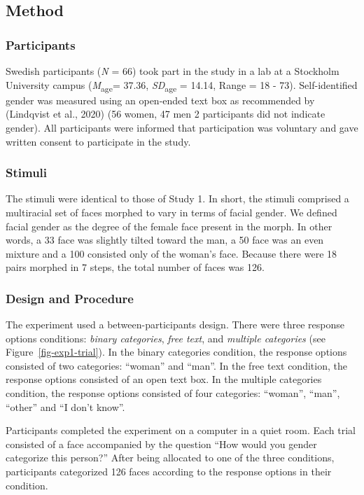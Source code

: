 \documentclass[
  man,
  longtable,
  nolmodern,
  notxfonts,
  notimes,
  colorlinks=true,linkcolor=blue,citecolor=blue,urlcolor=blue]{apa7}
\begin{document}
\subsection{Method}\label{method-1}

\subsubsection{Participants}\label{participants-1}

Swedish participants (\emph{N} = 66) took part in the study in a lab at
a Stockholm University campus (\emph{M}\textsubscript{age}= 37.36,
\emph{SD}\textsubscript{age} = 14.14, Range = 18 - 73). Self-identified
gender was measured using an open-ended text box as recommended by
(Lindqvist et al., 2020) (56 women, 47 men 2 participants did not
indicate gender). All participants were informed that participation was
voluntary and gave written consent to participate in the study.

\subsubsection{Stimuli}\label{stimuli-1}

The stimuli were identical to those of Study 1. In short, the stimuli
comprised a multiracial set of faces morphed to vary in terms of facial
gender. We defined facial gender as the degree of the female face
present in the morph. In other words, a 33 face was slightly tilted
toward the man, a 50 face was an even mixture and a 100 consisted only
of the woman's face. Because there were 18 pairs morphed in 7 steps, the
total number of faces was 126.

\subsubsection{Design and Procedure}\label{design-and-procedure-1}

The experiment used a between-participants design. There were three
response options conditions: \emph{binary categories}, \emph{free text},
and \emph{multiple categories} (see Figure~\ref{fig-exp1-trial}). In the
binary categories condition, the response options consisted of two
categories: ``woman'' and ``man''. In the free text condition, the
response options consisted of an open text box. In the multiple
categories condition, the response options consisted of four categories:
``woman'', ``man'', ``other'' and ``I don't know''.

Participants completed the experiment on a computer in a quiet room.
Each trial consisted of a face accompanied by the question ``How would
you gender categorize this person?'' After being allocated to one of the
three conditions, participants categorized 126 faces according to the
response options in their condition.
\end{document}
